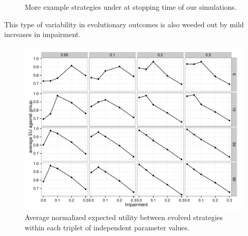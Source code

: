 \begin{figure}
  \caption{More example strategies under \rdd at stopping time of our simulations.}
  \label{fig:MoreExample_strats}
\end{figure}

This type of variability in evolutionary outcomes is also weeded out
by mild increases in impairment. 

\begin{figure}
  \centering

    \includegraphics[width=\textwidth]{plots/AverageEUinGroups.pdf}

   \caption{Average normalized expected utility between evolved strategies within each triplet of independent parameter values.}
  \label{fig:AverageEUinGroups}
\end{figure}






